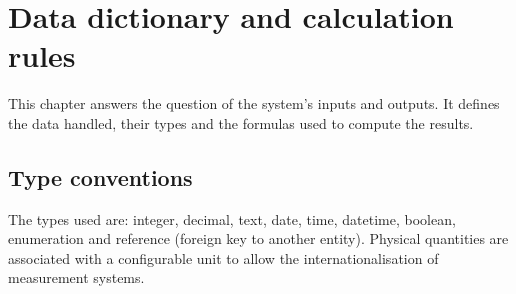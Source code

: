 \chapter{Data dictionary and calculation rules}
This chapter answers the question of the system's inputs and outputs. It defines
the data handled, their types and the formulas used to compute the results.

\section{Type conventions}
The types used are: integer, decimal, text, date, time, datetime, boolean,
enumeration and reference (foreign key to another entity). Physical quantities
are associated with a configurable unit to allow the internationalisation of
measurement systems.

